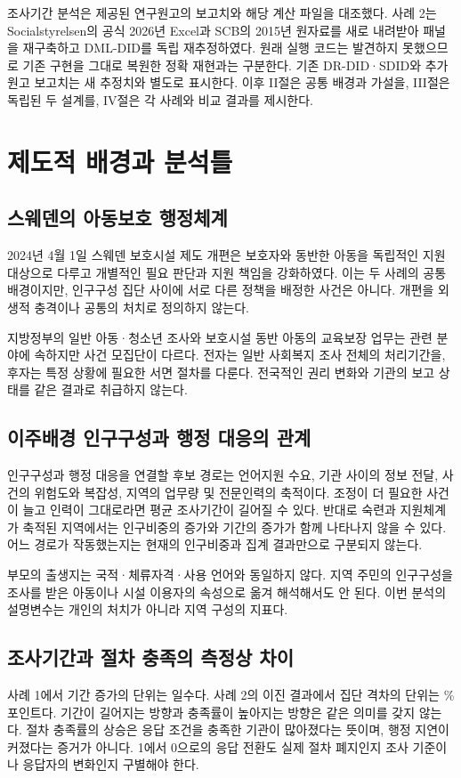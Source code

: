 \documentclass[11pt,a4paper]{article}
\begin{document}
조사기간 분석은 제공된 연구원고의 보고치와 해당 계산 파일을 대조했다. 사례 2는 Socialstyrelsen의 공식 2026년 Excel과 SCB의 2015년 원자료를 새로 내려받아 패널을 재구축하고 DML-DID를 독립 재추정하였다. 원래 실행 코드는 발견하지 못했으므로 기존 구현을 그대로 복원한 정확 재현과는 구분한다. 기존 DR-DID·SDID와 추가 원고 보고치는 새 추정치와 별도로 표시한다. 이후 II절은 공통 배경과 가설을, III절은 독립된 두 설계를, IV절은 각 사례와 비교 결과를 제시한다.

\section{제도적 배경과 분석틀}
\subsection{스웨덴의 아동보호 행정체계}
2024년 4월 1일 스웨덴 보호시설 제도 개편은 보호자와 동반한 아동을 독립적인 지원 대상으로 다루고 개별적인 필요 판단과 지원 책임을 강화하였다\cite{reform}. 이는 두 사례의 공통 배경이지만, 인구구성 집단 사이에 서로 다른 정책을 배정한 사건은 아니다. 개편을 외생적 충격이나 공통의 처치로 정의하지 않는다.

지방정부의 일반 아동·청소년 조사와 보호시설 동반 아동의 교육보장 업무는 관련 분야에 속하지만 사건 모집단이 다르다. 전자는 일반 사회복지 조사 전체의 처리기간을, 후자는 특정 상황에 필요한 서면 절차를 다룬다. 전국적인 권리 변화와 기관의 보고 상태를 같은 결과로 취급하지 않는다.

\subsection{이주배경 인구구성과 행정 대응의 관계}
인구구성과 행정 대응을 연결할 후보 경로는 언어지원 수요, 기관 사이의 정보 전달, 사건의 위험도와 복잡성, 지역의 업무량 및 전문인력의 축적이다. 조정이 더 필요한 사건이 늘고 인력이 그대로라면 평균 조사기간이 길어질 수 있다. 반대로 숙련과 지원체계가 축적된 지역에서는 인구비중의 증가와 기간의 증가가 함께 나타나지 않을 수 있다. 어느 경로가 작동했는지는 현재의 인구비중과 집계 결과만으로 구분되지 않는다.

부모의 출생지는 국적·체류자격·사용 언어와 동일하지 않다. 지역 주민의 인구구성을 조사를 받은 아동이나 시설 이용자의 속성으로 옮겨 해석해서도 안 된다. 이번 분석의 설명변수는 개인의 처치가 아니라 지역 구성의 지표다.

\subsection{조사기간과 절차 충족의 측정상 차이}
사례 1에서 기간 증가의 단위는 일수다. 사례 2의 이진 결과에서 집단 격차의 단위는 \%포인트다. 기간이 길어지는 방향과 충족률이 높아지는 방향은 같은 의미를 갖지 않는다. 절차 충족률의 상승은 응답 조건을 충족한 기관이 많아졌다는 뜻이며, 행정 지연이 커졌다는 증거가 아니다. 1에서 0으로의 응답 전환도 실제 절차 폐지인지 조사 기준이나 응답자의 변화인지 구별해야 한다.
\end{document}
